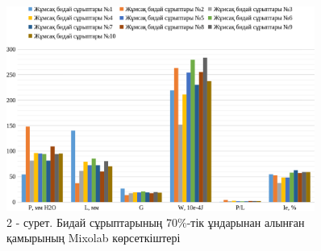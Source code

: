 \begin{figure}[H]
	\centering
	\includegraphics[width=0.9\textwidth]{media/pish2/image29}
	\caption*{2 - сурет. Бидай сұрыптарының 70\%-тік ұндарынан алынған қамырының Mixolab көрсеткіштері}
\end{figure}

